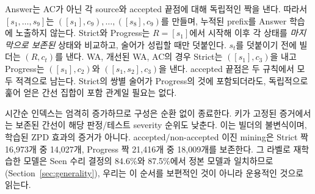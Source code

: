 \documentclass[10pt,conference]{IEEEtran}
\begin{document}
Answer는 AC가 아닌 각 source와 accepted 끝점에 대해 독립적인 짝을 낸다. 따라서 \([s_1,\ldots,s_9]\)는 \(([s_1],c_9),\ldots,([s_8],c_9)\)를 만들며, 누적된 prefix를 Answer 학습에 노출하지 않는다. Strict와 Progress는 \(R=[s_1]\)에서 시작해 이후 각 상태를 \emph{마지막으로 보존된} 상태와 비교하고, 술어가 성립할 때만 덧붙인다. \(s_t\)를 덧붙이기 전에 빌더는 \((R,c_t)\)를 낸다. WA, 개선된 WA, AC의 경우 Strict는 \(([s_1],c_3)\)을 내고 Progress는 \(([s_1],c_2)\)와 \(([s_1,s_2],c_3)\)을 낸다. accepted 끝점은 두 규칙에서 모두 적격으로 남는다. Strict의 쌍별 술어가 Progress의 것에 포함되더라도, 독립적으로 훑어 얻은 간선 집합이 포함 관계일 필요는 없다.

시간순 인덱스는 엄격히 증가하므로 구성은 순환 없이 종료한다. 키가 고정된 증거에서는 보존된 간선이 해당 판정/테스트 severity 순위도 낮춘다. 이는 빌더의 불변식이며, 학습된 ZPD 효과의 증거가 아니다. accepted/non-accepted 이진 mining은 Strict 짝 16,973개 중 14,027개, Progress 짝 21,416개 중 18,009개를 보존한다. 그 라벨로 재학습한 모델은 Seen 수리 결정의 84.6\%와 87.5\%에서 정본 모델과 일치하므로(Section~\ref{sec:generality}), 우리는 이 순서를 보편적인 것이 아니라 운용적인 것으로 읽는다.
\end{document}
